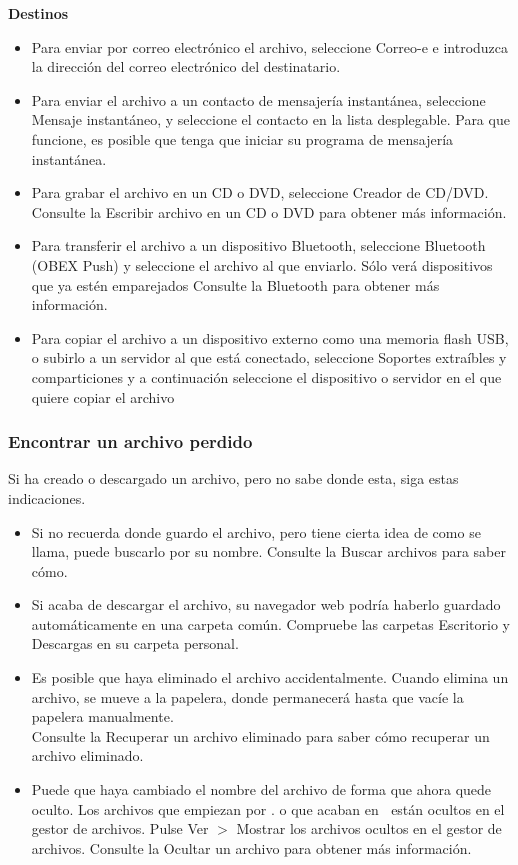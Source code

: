 {\bf Destinos}\\
\begin{itemize}
\item Para enviar por correo electrónico el archivo, seleccione Correo-e e introduzca la dirección del correo electrónico del destinatario.
\item Para enviar el archivo a un contacto de mensajería instantánea, seleccione Mensaje instantáneo, y seleccione el contacto en la lista desplegable. Para que funcione, es posible que tenga que iniciar su programa de mensajería instantánea.
\item Para grabar el archivo en un CD o DVD, seleccione Creador de CD/DVD. Consulte la Escribir archivo en un CD o DVD para obtener más información.
\item Para transferir el archivo a un dispositivo Bluetooth, seleccione Bluetooth (OBEX Push) y seleccione el archivo al que enviarlo. Sólo verá dispositivos que ya estén emparejados Consulte la Bluetooth para obtener más información.
\item Para copiar el archivo a un dispositivo externo como una memoria flash USB, o subirlo a un servidor al que está conectado, seleccione Soportes extraíbles y comparticiones y a continuación seleccione el dispositivo o servidor en el que quiere copiar el archivo
\end{itemize}
\subsubsection{Encontrar un archivo perdido}
Si ha creado o descargado un archivo, pero no sabe donde esta, siga estas indicaciones.\\
\begin{itemize}
\item Si no recuerda donde guardo el archivo, pero tiene cierta idea de como se llama, puede buscarlo por su nombre. Consulte la Buscar archivos para saber cómo.
\item Si acaba de descargar el archivo, su navegador web podría haberlo guardado automáticamente en una carpeta común. Compruebe las carpetas Escritorio y Descargas en su carpeta personal.
\item Es posible que haya eliminado el archivo accidentalmente. Cuando elimina un archivo, se mueve a la papelera, donde permanecerá hasta que vacíe la papelera manualmente.\\ Consulte la Recuperar un archivo eliminado para saber cómo recuperar un archivo eliminado.
\item Puede que haya cambiado el nombre del archivo de forma que ahora quede oculto. Los archivos que empiezan por . o que acaban en $~$ están ocultos en el gestor de archivos. Pulse Ver $>$ Mostrar los archivos ocultos en el gestor de archivos. Consulte la Ocultar un archivo para obtener más información.
\end{itemize}
